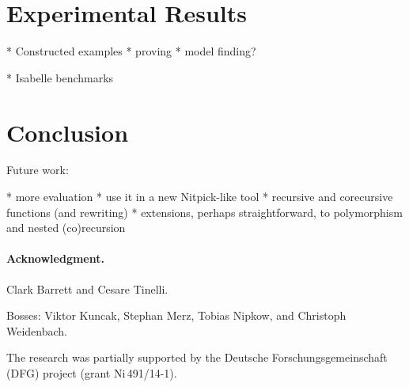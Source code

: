 \documentclass[a4paper,oribibl,envcountsame,draft]{llncs}
\begin{document}
\section{Experimental Results}
\label{sec:experimental-results}

  * Constructed examples
    * proving
    * model finding?

  * Isabelle benchmarks


\section{Conclusion}
\label{sec:conclusion}

Future work:

  * more evaluation
    * use it in a new Nitpick-like tool
  * recursive and corecursive functions
    (and rewriting)
  * extensions, perhaps straightforward, to polymorphism and nested
    (co)recursion

\def\ackname{Acknowledgment}
\paragraph{\ackname.}

Clark Barrett and Cesare Tinelli.

Bosses: Viktor Kuncak, Stephan Merz, Tobias Nipkow, and Christoph Weidenbach.

The research was partially supported by the Deutsche
Forschungs\-gemein\-schaft (DFG) project
 (grant Ni\,491\slash 14-1).


{}
\end{document}
